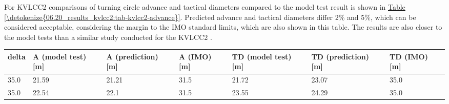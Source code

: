 \documentclass[review]{elsarticle}
\begin{document}
  
For KVLCC2 comparisons of turning circle advance and tactical diameters compared to the model test result is shown in \hyperref[\detokenize{06.20_results_kvlcc2:tab-kvlcc2-advance}]{Table \ref{\detokenize{06.20_results_kvlcc2:tab-kvlcc2-advance}}}. Predicted advance and tactical diameters differ 2\% and 5\%, which can be considered acceptable, considering the margin to the IMO standard limits, which are also shown in this table. The results are also closer to the model tests than a similar study conducted for the KVLCC2 \cite{he_nonparametric_2022}.


 \begin{savenotes}\sphinxattablestart
 \centering
 \sphinxthecaptionisattop
 \label{\detokenize{06.20_results_kvlcc2:tab-kvlcc2-advance}}
 \sphinxaftertopcaption
 \begin{tabulary}{\linewidth}[t]{|T|T|T|T|T|T|T|}
 \hline
 \sphinxstyletheadfamily 
 
 delta
 &\sphinxstyletheadfamily 
 
 A (model test) {[}m{]}
 &\sphinxstyletheadfamily 
 
 A (prediction) {[}m{]}
 &\sphinxstyletheadfamily 
 
 A (IMO) {[}m{]}
 &\sphinxstyletheadfamily 
 
 TD (model test) {[}m{]}
 &\sphinxstyletheadfamily 
 
 TD (prediction) {[}m{]}
 &\sphinxstyletheadfamily 
 
 TD (IMO) {[}m{]}
 \\
 \hline
 
 35.0
 &
 
 21.59
 &
 
 21.21
 &
 
 31.5
 &
 
 21.72
 &
 
 23.07
 &
 
 35.0
 \\
 \hline
 
 \sphinxhyphen{}35.0
 &
 
 22.54
 &
 
 22.1
 &
 
 31.5
 &
 
 23.55
 &
 
 24.29
 &
 
 35.0
 \\
 \hline
 \end{tabulary}
 \par
 \sphinxattableend\end{savenotes}
\end{document}
